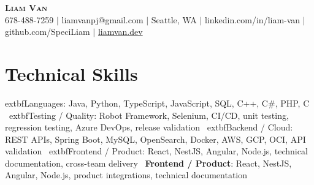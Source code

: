 \documentclass[letterpaper,11pt]{article}
\begin{document}

%
\begin{center}
    \textbf{\Huge \scshape Liam Van} \\ \vspace{1pt}
    \small 678-488-7259 $|$ \small {liamvanpj@gmail.com} $|$ Seattle, WA
 {{$|$ linkedin.com/in/liam-van} {$|$ github.com/SpeciLiam} {$|$ \href{https://liamvan.dev}{liamvan.dev}}}

\end{center}

\section{Technical Skills}
 \begin{itemize}[leftmargin=0.15in, label={}]
    \small{\item{
     	extbf{Languages}{: Java, Python, TypeScript, JavaScript, SQL, C++, C\#, PHP, C} \
     	extbf{Testing / Quality}{: Robot Framework, Selenium, CI/CD, unit testing, regression testing, Azure DevOps, release validation} \
     	extbf{Backend / Cloud}{: REST APIs, Spring Boot, MySQL, OpenSearch, Docker, AWS, GCP, OCI, API validation} \
     	extbf{Frontend / Product}{: React, NestJS, Angular, Node.js, technical documentation, cross-team delivery} \
     \textbf{Frontend / Product}{: React, NestJS, Angular, Node.js, product integrations, technical documentation} \\
    }}
 \end{itemize}
%

\end{document}
